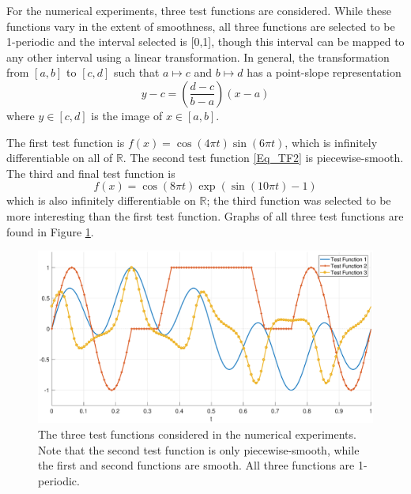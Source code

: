 \documentclass[12pt]{article}
\newcommand{\fcon}{f}
\begin{document}
For the numerical experiments, three test functions are considered. While these functions vary in the extent of smoothness, all three functions are selected to be 1-periodic and the interval selected is [0,1], though this interval can be mapped to any other interval using a linear transformation. In general, the transformation from $[a,b]$ to $[c,d]$ such that $a \mapsto c$ and $b \mapsto d$ has a point-slope representation
\[y - c = \left(\frac{d-c}{b-a}\right)(x - a)\]
where $y \in [c,d]$ is the image of $x \in [a,b]$. \par
The first test function is $\fcon(x) = \cos(4\pi{t})\sin(6\pi{t})$, which is infinitely differentiable on all of $\mathbb{R}$. The second test function \eqref{Eq_TF2} is piecewise-smooth. The third and final test function is
\begin{equation}
\fcon(x) = \cos(8\pi{t})\exp(\sin(10\pi{t})-1)
\label{Eq_TF3}
\end{equation}
which is also infinitely differentiable on $\mathbb{R}$; the third function was selected to be more interesting than the first test function. Graphs of all three test functions are found in Figure \ref{TestFunctions}.  \par

\begin{figure}
	\centerline{\includegraphics[scale = 0.45]{Figures/TestFunctions1D.eps}}
\caption{The three test functions considered in the numerical experiments. Note that the second test function is only piecewise-smooth, while the first and second functions are smooth. All three functions are 1-periodic.}
\label{TestFunctions}
\end{figure}
\end{document}
